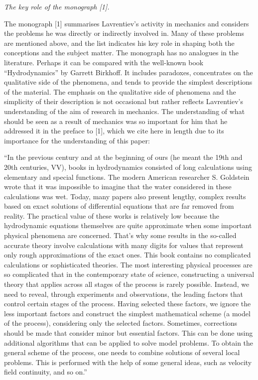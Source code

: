 \documentclass[%
 reprint,
onecolumn,
 amsmath,amssymb, aps,
]{revtex4-2}
\numberwithin{equation}{section}
\begin{document}
\textit{The key role of the monograph [1].}
\vspace{2mm}

The monograph [1] summarises Lavrentiev's activity in mechanics and considers the problems he was directly or indirectly involved in.
Many of these problems are mentioned above, and the list indicates his key role in shaping both the conceptions and the subject matter.
The monograph has no analogues in the literature.
Perhaps it can be compared with the well-known book “Hydrodynamics” by Garrett Birkhoff.
It includes paradoxes, concentrates on the qualitative side of the phenomena, and tends to provide the simplest descriptions of the material.
The emphasis on the qualitative side of phenomena and the simplicity of their description is not occasional but rather reflects Lavrentiev's understanding of the aim of research in mechanics.
The understanding of what should be seen as a result of mechanics was so important for him that he addressed it in the preface to [1], which we cite here in length due to its importance for the understanding of this paper:

“In the previous century and at the beginning of ours (he meant the 19th and 20th centuries, VV),  books in hydrodynamics consisted of long calculations using elementary and special functions.
The modern American researcher S. Goldstein wrote that it was impossible to imagine that the water considered in these calculations was wet.
Today, many papers also present lengthy, complex results based on exact solutions of differential equations that are far removed from reality.
The practical value of these works is relatively low because the hydrodynamic equations themselves are quite approximate when some important physical phenomena are concerned.
That’s why some results in the so-called accurate theory involve calculations with many digits for values that represent only rough approximations of the exact ones.
This book contains no complicated calculations or sophisticated theories.
The most interesting physical processes are so complicated that in the contemporary state of science, constructing a universal theory that applies across all stages of the process is rarely possible.
Instead, we need to reveal, through experiments and observations, the leading factors that control certain stages of the process.
Having selected these factors, we ignore the less important factors and construct the simplest mathematical scheme (a model of the process), considering only the selected factors.
Sometimes, corrections should be made that consider minor but essential factors.
This can be done using additional algorithms that can be applied to solve model problems.
To obtain the general scheme of the process, one needs to combine solutions of several local problems.
This is performed with the help of some general ideas, such as velocity field continuity, and so on.”
\end{document}
